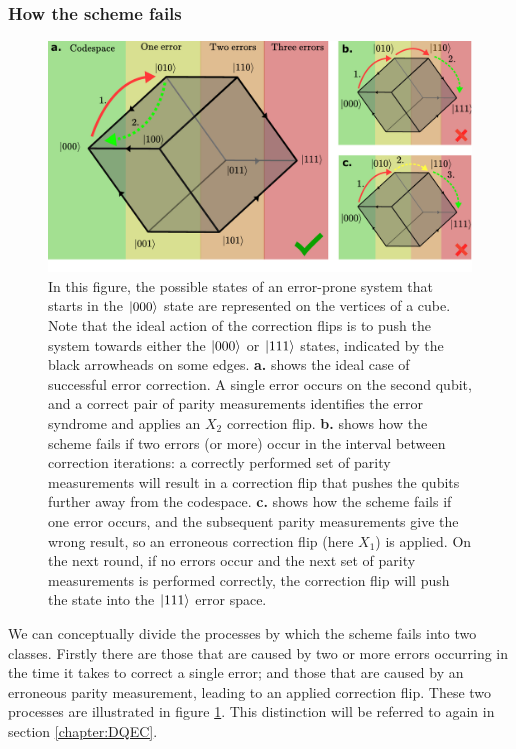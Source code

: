 \documentclass{report}
\begin{document}
\subsubsection{How the scheme fails}
\begin{figure}[ht]
    \centering
    \includegraphics[width = \textwidth]{Figures/cubediagram.pdf}
    \caption{In this figure, the possible states of an error-prone system that starts in the $\ket{000}$ state are represented on the vertices of a cube. Note that the ideal action of the correction flips is to push the system towards either the $\ket{000}$ or $\ket{111}$ states, indicated by the black arrowheads on some edges. \textbf{a.} shows the ideal case of successful error correction. A single error occurs on the second qubit, and a correct pair of parity measurements identifies the error syndrome and applies an $X_2$ correction flip. \textbf{b.} shows how the scheme fails if two errors (or more) occur in the interval between correction iterations: a correctly performed set of parity measurements will result in a correction flip that pushes the qubits further away from the codespace. \textbf{c.} shows how the scheme fails if one error occurs, and the subsequent parity measurements give the wrong result, so an erroneous correction flip (here $X_1$) is applied. On the next round, if no errors occur and the next set of parity measurements is performed correctly, the correction flip will push the state into the $\ket{111}$ error space.}
    \label{fig:cubediagram}
\end{figure}
We can conceptually divide the processes by which the scheme fails into two classes. Firstly there are those that are caused by two or more errors occurring in the time it takes to correct a single error; and those that are caused by an erroneous parity measurement, leading to an applied correction flip. These two processes are illustrated in figure \ref{fig:cubediagram}. This distinction will be referred to again in section \ref{chapter:DQEC}.
\end{document}
